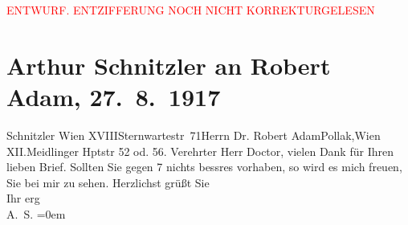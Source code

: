 
\begin{center}
            \textcolor{red}{ENTWURF. ENTZIFFERUNG NOCH NICHT KORREKTURGELESEN}
                      \end{center}
            
               \section[Arthur Schnitzler an Robert Adam, 27. 8. 1917]{ Arthur Schnitzler an Robert Adam, 27. 8. 1917}\nopagebreak{}\rehead{ }\begin{ledgroupsized}[t]{13cm}\normalsize\beginnumbering{} \toendnotes[C]{\smallbreak\pagebreak[2]} 
\toendnotes[C]{\smallbreak}\pstart{}{\pb}Schnitzler Wien
                            XVIII\pend{}\pstart{}Sternwartestr 71\pend{}{\bigskip}\pstart{}Herrn Dr. Robert Adam\pend{}\pstart{}Pollak,\pend{}\pstart{}Wien XII.\pend{}\pstart{}Meidlinger Hptstr 52 od. 56.\pend{}{\bigskip}\pstart
           \noindent{}{\pb}Verehrter Herr Doctor, vielen Dank für
                    Ihren lieben Brief. Sollten Sie \label{K_L02269_1v}\label{K_L02269_1h} gegen 7 nichts
                    bessres vorhaben, so wird es mich freuen, Sie bei mir zu sehen.\pend
           \pstart
           Herzlichst grüßt Sie{\\[\baselineskip]}Ihr erg{\\[\baselineskip]}\spacefill\mbox{A. S.}\pend
           \leftskip=0em{}\endnumbering{}\end{ledgroupsized}  \newcommand{\dateiname}{L02269}\newcommand{\titel}{Arthur Schnitzler an Robert Adam, 27. 8. 1917}\newcommand{\editorInnen}{Martin Anton Müller und Gerd-Hermann Susen}
      